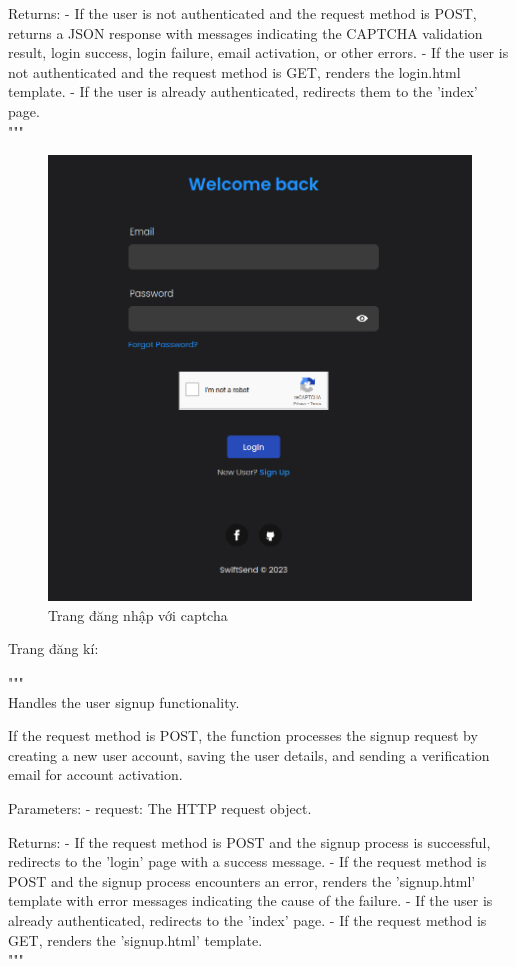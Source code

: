 \documentclass[paper=a4wide, fontsize=12pt]{scrartcl}	 %
\begin{document}
Returns:
- If the user is not authenticated and the request method is POST, returns a JSON response with messages indicating
  the CAPTCHA validation result, login success, login failure, email activation, or other errors.
- If the user is not authenticated and the request method is GET, renders the login.html template.
- If the user is already authenticated, redirects them to the 'index' page. \\
"""
\begin{figure}[H]
    \centering
    \includegraphics[scale=0.5]{demo/login.png}
    \caption{Trang đăng nhập với captcha}
\end{figure}

Trang đăng kí:

""" \\
Handles the user signup functionality.

If the request method is POST, the function processes the signup request by creating a new user account,
saving the user details, and sending a verification email for account activation.

Parameters:
- request: The HTTP request object.

Returns:
- If the request method is POST and the signup process is successful, redirects to the 'login' page with a success message.
- If the request method is POST and the signup process encounters an error, renders the 'signup.html' template with
  error messages indicating the cause of the failure.
- If the user is already authenticated, redirects to the 'index' page.
- If the request method is GET, renders the 'signup.html' template. \\
"""
\end{document}
